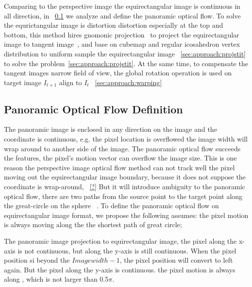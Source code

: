 % 
Comparing to the perspective image the equirectangular image is continuous in all direction, in ~\cref{sec:approach:definition} we analyze and define the panoramic optical flow.
%
To solve the equrictangular image is distortion distortion especially at the top and bottom, this method hires gnomonic projection~\cite{?} to project the equirectangular image to tangent image~\cite{?}, and base on cubemap and regular icosahedron vertex distribution to uniform sample the equirectangular image ~\cref{sec:approach:projstit} to solve the problem~\cref{sec:approach:projstit}.
%
At the same time, to compensate the tangent images narrow field of view, the global rotation operation is used on target image $I_{t+1}$ align to $I_t$ ~\cref{sec:approach:warping}

\subsection{Panoramic Optical Flow Definition}\label{sec:approach:definition}

The panoramic image is enclosed in any direction on the image and the coordinate is continuous, e.g. the pixel location is overflowed the image width will wrap around to another side of the image.
The panoramic optical flow succeeds the features, the pixel's motion vector can overflow the image size.
This is one reason the perspective image optical flow method can not track well the pixel moving out the equirectangular image boundary, because it does not suppose the coordinate is wrap-around, ~\cref{?}
%
But it will introduce ambiguity to the panoramic optical flow, 
there are two paths from the source point to the target point along the great-circle on the sphere ~\cite{??}.
To define the panoramic optical flow on equirectangular image format, we propose the following assumes:
the pixel motion is always moving along the the shortest path of great circle;

The panoramic image projection to equirectangular image, the pixel along the x-axis is not continuous, but along the y-axis is still continuous. When the pixel position si beyond the  ${Imagewidth -1}$, the pixel position will convert to left again.
But the pixel along the y-axis is continuous.
the pixel motion is always along , which is not larger than 0.5$\pi$.

